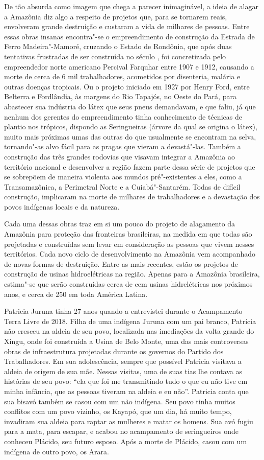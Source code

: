 De tão absurda como imagem que chega a parecer inimaginável, a ideia de
alagar a Amazônia diz algo a respeito de projetos que, para se tornarem
reais, envolveram grande destruição e custaram a vida de milhares de
pessoas. Entre essas obras insanas encontra"-se o empreendimento de
construção da Estrada de Ferro Madeira"-Mamoré, cruzando o Estado de
Rondônia, que após duas tentativas frustradas de ser construída no
século , foi concretizada pelo empreendedor norte americano Percival
Farquhar entre 1907 e 1912, causando a morte de cerca de 6 mil
trabalhadores, acometidos por disenteria, malária e outras doenças
tropicais. Ou o projeto iniciado em 1927 por Henry Ford, entre Belterra
e Fordlândia, às margens do Rio Tapajós, no Oeste do Pará, para
abastecer sua indústria do látex que seus pneus demandavam, e que faliu,
já que nenhum dos gerentes do empreendimento tinha conhecimento de
técnicas de plantio nos trópicos, dispondo as Seringueiras (árvore da
qual se origina o látex), muito mais próximas umas das outras do que
usualmente se encontram na selva, tornando"-as alvo fácil para as pragas
que vieram a devastá"-las. Também a construção das três grandes rodovias
que visavam integrar a Amazônia ao território nacional e desenvolver a
região fazem parte dessa série de projetos que se sobrepõem de maneira
violenta aos mundos pré"-existentes a eles, como a Transamazônica, a
Perimetral Norte e a Cuiabá"-Santarém. Todas de difícil construção,
implicaram na morte de milhares de trabalhadores e a devastação dos
povos indígenas locais e da natureza.

Cada uma dessas obras traz em si um pouco do projeto de alagamento da
Amazônia para proteção das fronteiras brasileiras, na medida em que
todas são projetadas e construídas sem levar em consideração as pessoas
que vivem nesses territórios. Cada novo ciclo de desenvolvimento na
Amazônia vem acompanhado de novas formas de destruição. Entre as mais
recentes, estão os projetos de construção de usinas hidroelétricas na
região. Apenas para a Amazônia brasileira, estima"-se que serão
construídas cerca de cem usinas hidrelétricas nos próximos anos, e cerca
de 250 em toda América Latina.

Patricia Juruna tinha 27 anos quando a entrevistei durante o Acampamento
Terra Livre de 2018. Filha de uma indígena Juruna com um pai branco,
Patrícia não cresceu na aldeia de seu povo, localizada nas imediações da
volta grande do Xingu, onde foi construída a Usina de Belo Monte, uma
das mais controversas obras de infraestrutura projetadas durante os
governos do Partido dos Trabalhadores. Em sua adolescência, sempre que
possível Patricia visitava a aldeia de origem de sua mãe. Nessas
visitas, uma de suas tias lhe contava as histórias de seu povo: ``ela
que foi me transmitindo tudo o que eu não tive em minha infância, que as
pessoas tiveram na aldeia e eu não''. Patricia conta que sua bisavó
também se casou com um não indígena. Seu povo tinha muitos conflitos com
um povo vizinho, os Kayapó, que um dia, há muito tempo, invadiram sua
aldeia para raptar as mulheres e matar os homens. Sua avó fugiu para a
mata, para escapar, e acabou no acampamento de seringueiros onde
conheceu Plácido, seu futuro esposo. Após a morte de Plácido, casou com
um indígena de outro povo, os Arara.

